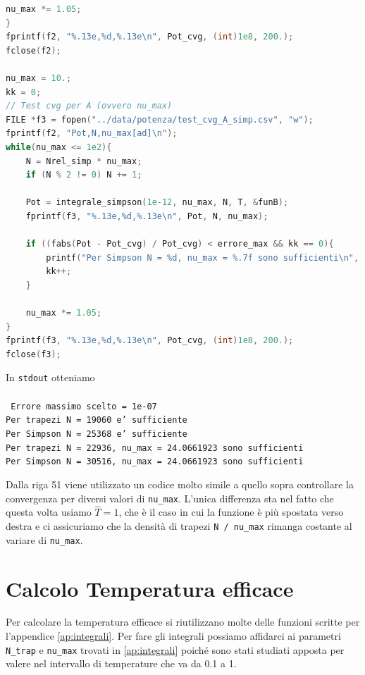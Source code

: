 \documentclass[a4paper, titlepage]{article}
\begin{document}
\begin{lstlisting}[language=C]
    nu_max *= 1.05;
}
fprintf(f2, "%.13e,%d,%.13e\n", Pot_cvg, (int)1e8, 200.);
fclose(f2);

nu_max = 10.;
kk = 0;
// Test cvg per A (ovvero nu_max)
FILE *f3 = fopen("../data/potenza/test_cvg_A_simp.csv", "w");
fprintf(f2, "Pot,N,nu_max[ad]\n");
while(nu_max <= 1e2){
    N = Nrel_simp * nu_max;
    if (N % 2 != 0) N += 1;

    Pot = integrale_simpson(1e-12, nu_max, N, T, &funB);
    fprintf(f3, "%.13e,%d,%.13e\n", Pot, N, nu_max);

    if ((fabs(Pot - Pot_cvg) / Pot_cvg) < errore_max && kk == 0){
        printf("Per Simpson N = %d, nu_max = %.7f sono sufficienti\n", N, nu_max);
        kk++;
    }

    nu_max *= 1.05;
}
fprintf(f3, "%.13e,%d,%.13e\n", Pot_cvg, (int)1e8, 200.);
fclose(f3);
\end{lstlisting}

In \texttt{stdout} otteniamo \\ \\
\texttt{
Errore massimo scelto = 1e-07 \\
Per trapezi N = 19060 e' sufficiente \\
Per Simpson N = 25368 e' sufficiente \\
Per trapezi N = 22936, nu\_max = 24.0661923 sono sufficienti \\
Per Simpson N = 30516, nu\_max = 24.0661923 sono sufficienti \\
}

Dalla riga 51 viene utilizzato un codice molto simile a quello sopra controllare
la convergenza per diversi valori di \texttt{nu\_max}.
L'unica differenza sta nel fatto che questa volta usiamo $\hat T = 1$, che è il
caso in cui la funzione è più spostata verso destra e ci assicuriamo che
la densità di trapezi \texttt{N / nu\_max} rimanga costante al variare di
\texttt{nu\_max}.


\section{Calcolo Temperatura efficace} \label{ap:Teff}

Per calcolare la temperatura efficace si riutilizzano molte delle funzioni scritte per l'appendice \ref{ap:integrali}.
Per fare gli integrali possiamo affidarci ai parametri \texttt{N\_trap} e
\texttt{nu\_max} trovati in \ref{ap:integrali} poiché sono stati studiati
apposta per valere nel intervallo di temperature che va da 0.1 a 1.
\end{document}
